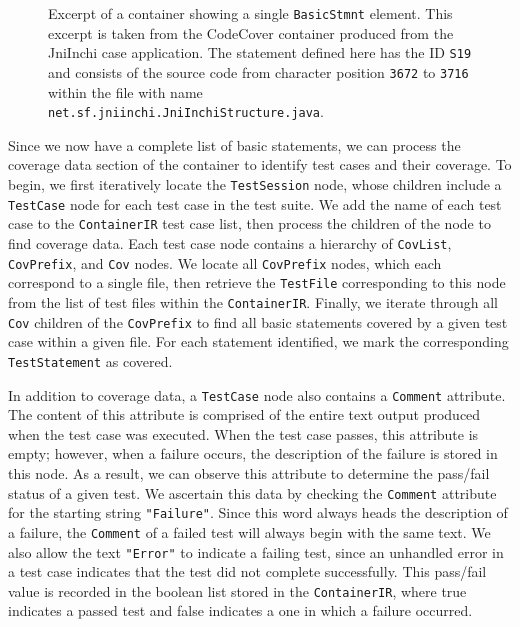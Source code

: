 \begin{figure}[tb]
\centering

\caption{Excerpt of a container showing a single \texttt{BasicStmnt} element.  This excerpt is taken
from the CodeCover container produced from the JniInchi case application.  The statement defined here
has the ID \texttt{S19} and consists of the source code from character position \texttt{3672} to 
\texttt{3716} within the file with name \texttt{net.sf.jniinchi.JniInchiStructure.java}.}
\label{fig:xml-basic}
\end{figure}

Since we now have a complete list of basic statements, we can process the coverage data section
of the container to identify test cases and their coverage.  To begin, we first iteratively 
locate the \texttt{TestSession} node, whose children include a \texttt{TestCase} node for
each test case in the test suite.  We add the name of each test case to the \texttt{ContainerIR}
test case list, then process the children of the node to find coverage data.  Each test case
node contains a hierarchy of \texttt{CovList}, \texttt{CovPrefix}, and \texttt{Cov} nodes.  We 
locate all \texttt{CovPrefix} nodes, which each correspond to a single file, then retrieve the
\texttt{TestFile} corresponding to this node from the list of test files within the \texttt{ContainerIR}.
Finally, we iterate through all \texttt{Cov} children of the \texttt{CovPrefix} to find all 
basic statements covered by a given test case within a given file.  For each statement identified,
we mark the corresponding \texttt{TestStatement} as covered.

In addition to coverage data, a \texttt{TestCase} node also contains a \texttt{Comment} attribute.
The content of this attribute is comprised of the entire text output produced when the test case
was executed.  When the test case passes, this attribute is empty; however, when a failure occurs,
the description of the failure is stored in this node.  As a result, we can observe this attribute
to determine the pass/fail status of a given test.  We ascertain this data by checking the
\texttt{Comment} attribute for the starting string \texttt{"Failure"}.  Since this word always
heads the description of a failure, the \texttt{Comment} of a failed test will always begin with
the same text.  We also allow the text \texttt{"Error"} to indicate a failing test, since an unhandled
error in a test case indicates that the test did not complete successfully.  This pass/fail value is
recorded in the boolean list stored in the \texttt{ContainerIR}, where true indicates a passed test and
false indicates a one in which a failure occurred.

